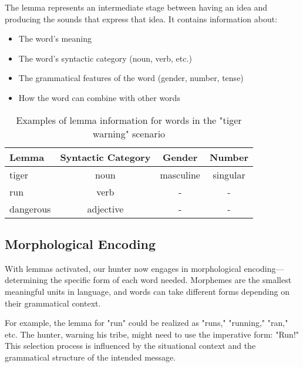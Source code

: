 \documentclass[12pt,a4paper]{article}
\begin{document}
The lemma represents an intermediate stage between having an idea and producing the sounds that express that idea. It contains information about:

\begin{itemize}
\item The word's meaning
\item The word's syntactic category (noun, verb, etc.)
\item The grammatical features of the word (gender, number, tense)
\item How the word can combine with other words
\end{itemize}

\begin{table}[h]
\centering
\begin{tabular}{|l|c|c|c|}
\hline
\textbf{Lemma} & \textbf{Syntactic Category} & \textbf{Gender} & \textbf{Number} \\
\hline
tiger & noun & masculine & singular \\
run & verb & - & - \\
dangerous & adjective & - & - \\
\hline
\end{tabular}
\caption{Examples of lemma information for words in the "tiger warning" scenario}
\label{tbl:lemma_info}
\end{table}

\subsection{Morphological Encoding}

With lemmas activated, our hunter now engages in morphological encoding—determining the specific form of each word needed. Morphemes are the smallest meaningful units in language, and words can take different forms depending on their grammatical context.

For example, the lemma for "run" could be realized as "runs," "running," "ran," etc. The hunter, warning his tribe, might need to use the imperative form: "Run!" This selection process is influenced by the situational context and the grammatical structure of the intended message.

\begin{tcolorbox}[title=The Morphological Specification of "Tiger"]
\begin{center}
\end{center}
\end{tcolorbox}
\end{document}
